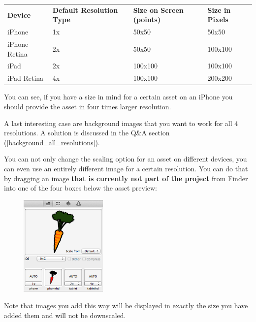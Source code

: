 \begin{table}[H]
\begin{tabular}{llll}
\textbf{Device} & \textbf{Default Resolution Type} & \textbf{Size on Screen (points)} & \textbf{Size in Pixels} \\
iPhone          & 1x                               & 50x50                            & 50x50                   \\
iPhone Retina   & 2x                               & 50x50                            & 100x100                 \\
iPad            & 2x                               & 100x100                          & 100x100                 \\
iPad Retina     & 4x                               & 100x100                          & 200x200                
\end{tabular}
\end{table}

You can see, if you have a size in mind for a certain asset on an iPhone you
should provide the asset in four times larger resolution.

A last interesting case are background images that you want to work for
all 4 resolutions. A solution is discussed in
the Q\&A section (\ref{background_all_resolutions}).

\begin{details}[frametitle={Different images for different devices}] 
You can not only change the scaling option for an asset on different devices,
you can even use an entirely different image for a certain resolution. You can
do that by dragging an image \textbf{that is currently not part of the \SB{}
project} from Finder into one of the four boxes below the asset preview:
\begin{figure}[H]
		\centering
		\includegraphics[height=140pt]{images/Chapter2/DifferentImageDevice.png}
\end{figure}

Note that images you add this way will be displayed in exactly the size you have
added them and will not be downscaled.

\end{details}

